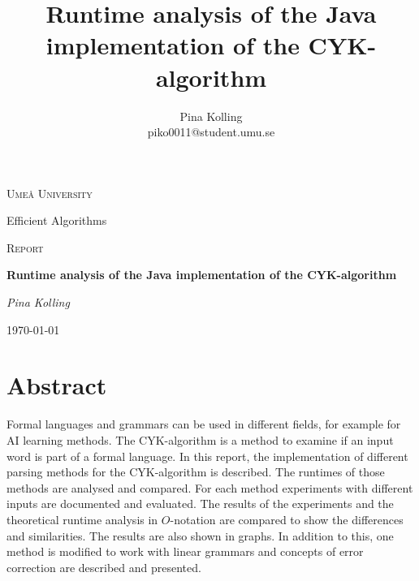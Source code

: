 \documentclass[a4paper, 11pt]{article}
\title{Runtime analysis of the Java implementation of the CYK-algorithm}
\author{Pina Kolling \\ piko0011@student.umu.se}
\begin{document}
\begin{titlepage}
	\centering
	{\scshape\LARGE Ume\r{a} University \par}
	Efficient Algorithms \par
	\vspace{1cm}
	{\scshape\Large Report\par }
	\vspace{1.5cm}
	{\huge\bfseries  Runtime analysis of the Java implementation of the CYK-algorithm \par}
	\vspace{2cm}
	{\Large\itshape Pina Kolling\par}
	\vfill

	{\large \today\par}
\end{titlepage}











\section*{Abstract}

Formal languages and grammars can be used in different fields, for example for AI learning methods. The CYK-algorithm is a method to examine if an input word is part of a formal language. 
In this report, the implementation of different parsing methods for the CYK-algorithm is described. The runtimes of those methods are analysed and compared. For each method experiments with different inputs are documented and evaluated. The results of the experiments and the theoretical runtime analysis in $O$-notation are compared to show the differences and similarities. The results are also shown in graphs.
In addition to this, one method is modified to work with linear grammars and concepts of error correction are described and presented. 















\setcounter{page}{1}
\end{document}
